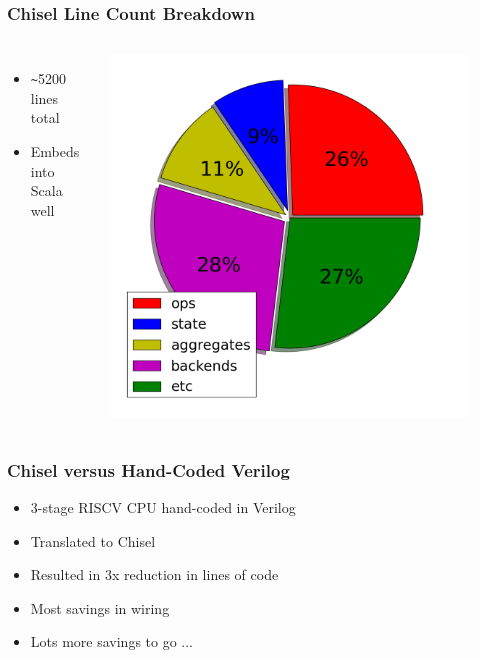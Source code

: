 \documentclass[xcolor=pdflatex,dvipsnames,table]{beamer}
\begin{document}
\begin{frame}[fragile]
\frametitle{Chisel Line Count Breakdown}

\begin{columns}


\begin{itemize}
\item \verb+~+5200 lines total
\item Embeds into Scala well
\end{itemize}


\begin{center}
\includegraphics[width=0.9\textwidth]{figs/linecount.png}
\end{center}

\end{columns}

\end{frame}

\begin{frame}
\frametitle {Chisel versus Hand-Coded Verilog}

\begin{itemize}
\item 3-stage RISCV CPU hand-coded in Verilog
\item Translated to Chisel
\item Resulted in 3x reduction in lines of code
\item Most savings in wiring
\item Lots more savings to go ...
\end{itemize}

\end{frame}
\end{document}
